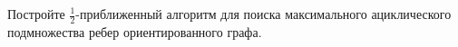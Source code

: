 Постройте $\frac{1}{2}$-приближенный алгоритм для поиска максимального ациклического подмножества ребер
ориентированного графа.
